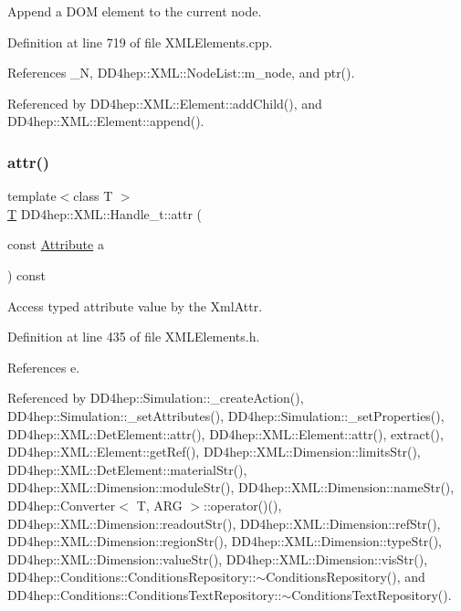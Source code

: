 Append a D\+OM element to the current node. 



Definition at line 719 of file X\+M\+L\+Elements.\+cpp.



References \+\_\+N, D\+D4hep\+::\+X\+M\+L\+::\+Node\+List\+::m\+\_\+node, and ptr().



Referenced by D\+D4hep\+::\+X\+M\+L\+::\+Element\+::add\+Child(), and D\+D4hep\+::\+X\+M\+L\+::\+Element\+::append().

\hypertarget{class_d_d4hep_1_1_x_m_l_1_1_handle__t_a5b116e138ee498803385f9ec503395c3}{}\label{class_d_d4hep_1_1_x_m_l_1_1_handle__t_a5b116e138ee498803385f9ec503395c3} 
\subsubsection{\texorpdfstring{attr()}{attr()}\hspace{0.1cm}{\footnotesize\ttfamily [1/10]}}
{\footnotesize\ttfamily template$<$class T $>$ \\
\hyperlink{class_t}{T} D\+D4hep\+::\+X\+M\+L\+::\+Handle\+\_\+t\+::attr (\begin{DoxyParamCaption}\item[{const \hyperlink{namespace_d_d4hep_1_1_x_m_l_a5c19b7116be99d69b4b22d911357baaf}{Attribute}}]{a }\end{DoxyParamCaption}) const\hspace{0.3cm}{\ttfamily [inline]}}



Access typed attribute value by the Xml\+Attr. 



Definition at line 435 of file X\+M\+L\+Elements.\+h.



References e.



Referenced by D\+D4hep\+::\+Simulation\+::\+\_\+create\+Action(), D\+D4hep\+::\+Simulation\+::\+\_\+set\+Attributes(), D\+D4hep\+::\+Simulation\+::\+\_\+set\+Properties(), D\+D4hep\+::\+X\+M\+L\+::\+Det\+Element\+::attr(), D\+D4hep\+::\+X\+M\+L\+::\+Element\+::attr(), extract(), D\+D4hep\+::\+X\+M\+L\+::\+Element\+::get\+Ref(), D\+D4hep\+::\+X\+M\+L\+::\+Dimension\+::limits\+Str(), D\+D4hep\+::\+X\+M\+L\+::\+Det\+Element\+::material\+Str(), D\+D4hep\+::\+X\+M\+L\+::\+Dimension\+::module\+Str(), D\+D4hep\+::\+X\+M\+L\+::\+Dimension\+::name\+Str(), D\+D4hep\+::\+Converter$<$ T, A\+R\+G $>$\+::operator()(), D\+D4hep\+::\+X\+M\+L\+::\+Dimension\+::readout\+Str(), D\+D4hep\+::\+X\+M\+L\+::\+Dimension\+::ref\+Str(), D\+D4hep\+::\+X\+M\+L\+::\+Dimension\+::region\+Str(), D\+D4hep\+::\+X\+M\+L\+::\+Dimension\+::type\+Str(), D\+D4hep\+::\+X\+M\+L\+::\+Dimension\+::value\+Str(), D\+D4hep\+::\+X\+M\+L\+::\+Dimension\+::vis\+Str(), D\+D4hep\+::\+Conditions\+::\+Conditions\+Repository\+::$\sim$\+Conditions\+Repository(), and D\+D4hep\+::\+Conditions\+::\+Conditions\+Text\+Repository\+::$\sim$\+Conditions\+Text\+Repository().

